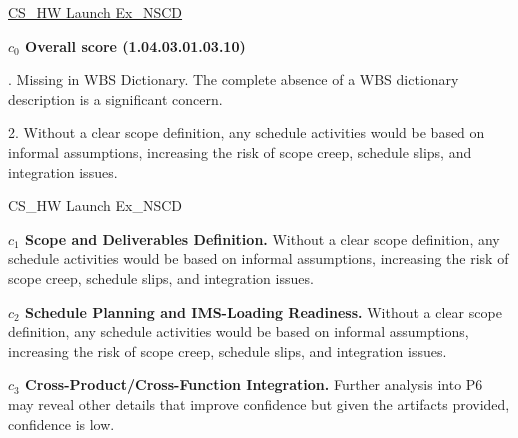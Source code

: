 % 


\begin{frame}{\href{run:../local/source-docs/1.04.03.01.03.10.pdf}{CS\_HW Launch Ex\_NSCD}}
\centering
{}
\par
\vspace{0.75em}
\textbf{\small{\(c_0\) Overall score {\tiny (1.04.03.01.03.10)}}}\\\par
\vspace{0.5em}
\begin{minipage}{0.85\textwidth}
\raggedright
\fontsize{7}{9}. Missing in WBS Dictionary. The complete absence of a WBS dictionary description is a significant concern.\par\vspace{0.5em}2. Without a clear scope definition, any schedule activities would be based on informal assumptions, increasing the risk of scope creep, schedule slips, and integration issues.\par
\end{minipage}
\end{frame}
%
\begin{frame}{CS\_HW Launch Ex\_NSCD}
\begin{minipage}{0.90\textwidth}
\raggedright
\fontsize{8}{9.5}\selectfont
\textbf{\(c_1\) Scope and Deliverables Definition.}
Without a clear scope definition, any schedule activities would be based on informal assumptions, increasing the risk of scope creep, schedule slips, and integration issues.\par\vspace{0.6em}
\textbf{\(c_2\) Schedule Planning and IMS-Loading Readiness.}
Without a clear scope definition, any schedule activities would be based on informal assumptions, increasing the risk of scope creep, schedule slips, and integration issues.\par\vspace{0.6em}
\textbf{\(c_3\) Cross-Product/Cross-Function Integration.}
Further analysis into P6 may reveal other details that improve confidence but given the artifacts provided, confidence is low.\par\vspace{0.6em}
\end{minipage}
\end{frame}

\endinput
